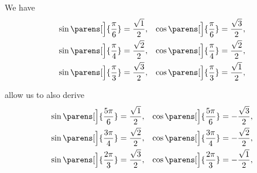 \begin{proposition}\label{thm:trigonometric_function_secondary_roots}
  We have
  \begin{align}
    \sin\parens[\Big]{\frac \pi 6} = \frac {\sqrt 1} 2, && \cos\parens[\Big]{\frac \pi 6} = \frac {\sqrt 3} 2, \label{eq:thm:trigonometric_function_secondary_roots/sixth} \\
    \sin\parens[\Big]{\frac \pi 4} = \frac {\sqrt 2} 2, && \cos\parens[\Big]{\frac \pi 4} = \frac {\sqrt 2} 2, \label{eq:thm:trigonometric_function_secondary_roots/quarter} \\
    \sin\parens[\Big]{\frac \pi 3} = \frac {\sqrt 3} 2, && \cos\parens[\Big]{\frac \pi 3} = \frac {\sqrt 1} 2, \label{eq:thm:trigonometric_function_secondary_roots/third}
  \end{align}

   allow us to also derive
  \begin{align}
    \sin\parens[\Big]{\frac {5\pi} 6} = \frac {\sqrt 1} 2, && \cos\parens[\Big]{\frac {5\pi} 6} = -\frac {\sqrt 3} 2, \label{eq:thm:trigonometric_function_secondary_roots/five_sixths} \\
    \sin\parens[\Big]{\frac {3\pi} 4} = \frac {\sqrt 2} 2, && \cos\parens[\Big]{\frac {3\pi} 4} = -\frac {\sqrt 2} 2, \label{eq:thm:trigonometric_function_secondary_roots/three_quarters} \\
    \sin\parens[\Big]{\frac {2\pi} 3} = \frac {\sqrt 3} 2, && \cos\parens[\Big]{\frac {2\pi} 3} = -\frac {\sqrt 1} 2, \label{eq:thm:trigonometric_function_secondary_roots/two_thirds}
  \end{align}
\end{proposition}
